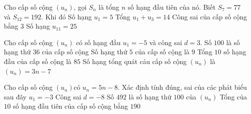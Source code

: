 \begin{ex}%
 Cho cấp số cộng $\left(u_n \right)$, gọi $S_n$ là tổng $n$ số hạng đầu tiên của nó. Biết $S_7=77$ và $S_{12}=192$. Khi đó 
 \choiceTF 
  {\True Số hạng  $u_1=5$}
  {\True Tổng  $u_1+u_3=14$}
  {Công sai của cấp số cộng bằng $3$} 
  {\True  Số hạng $u_{11}=25$}
\end{ex}

\begin{ex}%
 Cho  cấp số cộng $\left(u_n\right)$ có số hạng đầu $u_1=-5$ và công sai $ d=3$.
 \choiceTF 
  {\True Số $100$ là số hạng thứ $36$ của cấp  số cộng}
  { Số hạng thứ $5$ của  cấp số cộng là $ 9$}
  {\True  Tổng $10$ số hạng đầu của cấp số cộng là $85$}
  {Số hạng tổng quát cảu cấp số cộng $\left(u_n\right)$ là  $\left(u_n\right)=3n-7$}
\end{ex}

\begin{ex}%
 Cho cấp số cộng $\left(u_n\right)$có $u_n=5n-8$. Xác định tính  đúng, sai của các phát biểu sau đây
 \choiceTF 
  {\True $u_1=-3$} 
  {Công sai  $ d=-8$}
  {\True Số $492$ là  số hạng thứ $100$ của $\left(u_n\right)$}
  {Tổng của $10$ số hạng đầu tiên của cấp  số cộng bằng $ 190$}
\end{ex}

